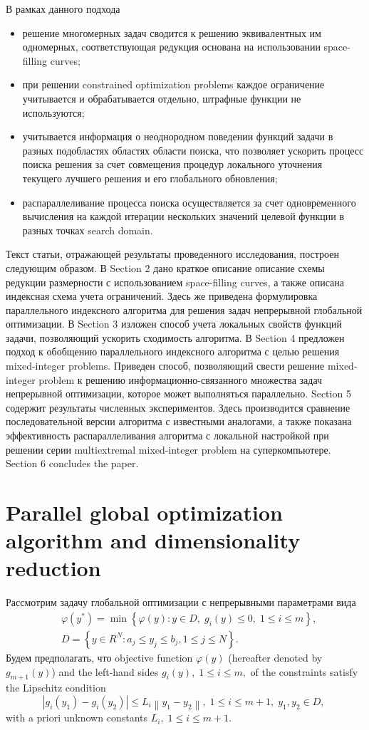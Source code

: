 \documentclass[
11pt,%
tightenlines,%
twoside,%
onecolumn,%
nofloats,%
nobibnotes,%
nofootinbib,%
superscriptaddress,%
noshowpacs,%
centertags]%
{revtex4}
\begin{document}
В рамках данного подхода 
\begin{itemize}
	\item 
	решение многомерных задач сводится  к решению эквивалентных им одномерных, cоответствующая редукция основана на использовании space-filling curves;
	\item 
	при решении constrained optimization problems каждое ограничение учитывается и обрабатывается отдельно, штрафные функции не используются;
	\item
	учитывается информация о неоднородном поведении функций задачи в разных подобластях областях области поиска, что позволяет ускорить процесс поиска решения за счет совмещения процедур локального уточнения текущего лучшего решения и его глобального обновления;
	\item 
	распараллеливание процесса поиска осуществляется за счет одновременного вычисления на каждой итерации нескольких значений целевой функции в разных точках search domain.	
\end{itemize}

Текст статьи, отражающей результаты проведенного исследования, построен следующим образом. 
В Section 2 дано краткое описание описание схемы редукции размерности с использованием space-filling curves, а также описана индексная схема учета ограничений. Здесь же приведена формулировка параллельного индексного алгоритма для решения задач непрерывной глобальной оптимизации.
В Section 3 изложен способ учета локальных свойств функций задачи, позволяющий ускорить сходимость алгоритма.
В Section 4 предложен подход к обобщению параллельного индексного алгоритма с целью решения mixed-integer problems. Приведен способ, позволяющий свести решение mixed-integer problem к решению информационно-связанного множества задач непрерывной оптимизации, которое может выполняться параллельно. 
Section 5 содержит результаты численных экспериментов. Здесь производится сравнение последовательной версии алгоритма с известными аналогами, а также показана эффективность распараллеливания алгоритма с локальной настройкой при решении серии multiextremal mixed-integer problem на суперкомпьютере.  
Section 6 concludes the paper.

\section{Parallel global optimization algorithm and dimensionality reduction}

Рассмотрим задачу глобальной оптимизации с непрерывными параметрами вида
\begin{eqnarray}\label{problem}
&\varphi(y^\ast)=\min{\left\{\varphi(y):y\in D, \; g_i(y)\leq 0, \; 1 \leq i \leq m\right\}},\\
&D=\left\{y\in R^N: a_j\leq y_j \leq b_j, 1\leq j \leq N \right\}.\label{D}
\end{eqnarray}
Будем предполагать, что objective function $\varphi(y)$ (hereafter denoted by $g_{m+1}(y)$) and the left-hand sides $g_i(y), \; 1\leq i \leq m,$ of the constraints satisfy the Lipschitz condition 
\[
\left|g_i(y_1)-g_i(y_2)\right|\leq L_i\left\|y_1-y_2\right\|, \;1\leq i\leq m+1, \; y_1,y_2 \in D,\;
\]
with a priori unknown constants $L_i, \; 1 \leq i \leq m+1$. 
\end{document}
